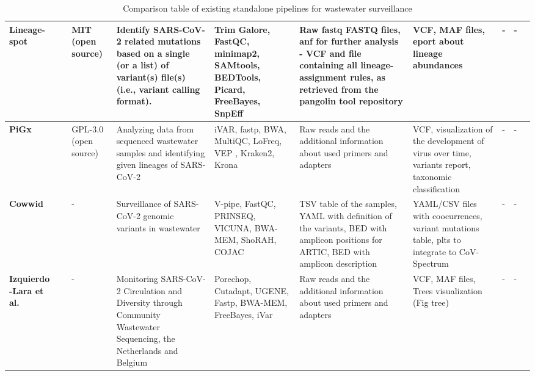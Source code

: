\begin{landscape}
\begin{table}[ht!]
\begin{tabular}{l|l|l|l|l|l|l|l|l|l}
\multicolumn{1}{m{1cm}|}{\textbf{Lineage- spot}}&\multicolumn{1}{m{1cm}|}{\cite{pechlivanis2022}}&\multicolumn{1}{m{1cm}|}{MIT (open source)}&\multicolumn{1}{m{3cm}|}{Identify SARS-CoV-2 related mutations based on a single (or a list) of variant(s) file(s) (i.e., variant calling format).}&\multicolumn{1}{m{3cm}|}{Trim Galore, FastQC, minimap2, SAMtools, BEDTools, Picard, FreeBayes, SnpEff}&\multicolumn{1}{m{3cm}|}{Raw fastq FASTQ files, anf for further analysis - VCF and file containing all lineage-assignment rules, as retrieved from the pangolin tool repository}&\multicolumn{1}{m{3cm}|}{VCF, MAF files, eport about lineage abundances}&\multicolumn{1}{m{1cm}|}{-}&\multicolumn{1}{m{1cm}|}{-}&\multicolumn{1}{m{1cm}}{\cite{pechlivanis2022}}\\ \hline 
\multicolumn{1}{m{1cm}|}{\textbf{PiGx}}&\multicolumn{1}{m{1cm}|}{\cite{schumann2021}}&\multicolumn{1}{m{1cm}|}{GPL-3.0 (open source)}&\multicolumn{1}{m{3cm}|}{Analyzing data from sequenced wastewater samples and identifying given lineages of SARS-CoV-2}&\multicolumn{1}{m{3cm}|}{iVAR, fastp, BWA, MultiQC, LoFreq, VEP , Kraken2, Krona}&\multicolumn{1}{m{3cm}|}{Raw reads and the additional information about used primers and adapters}&\multicolumn{1}{m{3cm}|}{VCF, visualization of the development of virus over time, variants report, taxonomic classification}&\multicolumn{1}{m{1cm}|}{-}&\multicolumn{1}{m{1cm}|}{-}&\multicolumn{1}{m{1cm}}{\cite{schumann2021}}\\ \hline 
\multicolumn{1}{m{1cm}|}{\textbf{Cowwid}}&\multicolumn{1}{m{1cm}|}{\cite{jahn2021}}&\multicolumn{1}{m{1cm}|}{-}&\multicolumn{1}{m{3cm}|}{Surveillance of SARS-CoV-2 genomic variants in wastewater}&\multicolumn{1}{m{3cm}|}{V-pipe, FastQC, PRINSEQ, VICUNA, BWA-MEM, ShoRAH, COJAC}&\multicolumn{1}{m{3cm}|}{TSV table of the samples, YAML with definition of the variants, BED with amplicon positions for ARTIC, BED with amplicon description}&\multicolumn{1}{m{3cm}|}{YAML/CSV files with coocurrences, variant mutations table, plts to integrate to CoV-Spectrum}&\multicolumn{1}{m{1cm}|}{-}&\multicolumn{1}{m{1cm}|}{-}&\multicolumn{1}{m{1cm}}{\cite{jahn2021,swisscovspectrum}}\\ \hline 
\multicolumn{1}{m{1cm}|}{\textbf{Izquierdo -Lara et al.}}&\multicolumn{1}{m{1cm}|}{\cite{izquierdo}}&\multicolumn{1}{m{1cm}|}{-}&\multicolumn{1}{m{3cm}|}{Monitoring SARS-CoV-2 Circulation and Diversity through Community Wastewater Sequencing, the Netherlands and Belgium}&\multicolumn{1}{m{3cm}|}{Porechop, Cutadapt, UGENE, Fastp, BWA-MEM, FreeBayes, iVar}&\multicolumn{1}{m{3cm}|}{Raw reads and the additional information about used primers and adapters}&\multicolumn{1}{m{3cm}|}{VCF, MAF files, Trees visualization (Fig tree)}&\multicolumn{1}{m{1cm}|}{-}&\multicolumn{1}{m{1cm}|}{-}&\multicolumn{1}{m{1cm}}{\cite{izquierdo}}\\ \hline 
                \end{tabular}
                \caption{Comparison table of existing standalone pipelines for wastewater surveillance} \label{tab:prior:methods-pipelines}
                \end{table}
                \vfill
            \end{landscape}
        

